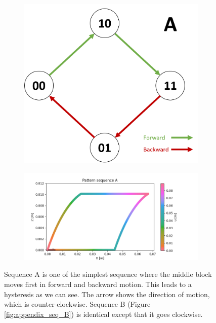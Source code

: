         \begin{figure}[h]
            \centering
            \begin{subfigure}{.2\textwidth}
            \includegraphics[width=\textwidth]{images/S_A.png}
            \end{subfigure}%
            \begin{subfigure}{.6\textwidth}
            \includegraphics[width=\textwidth]{images/A.png}
            \end{subfigure}
            \caption{Sequence A is one of the simplest sequence where the middle block moves first in forward and backward motion. This leads to a hysteresis as we can see. The arrow shows the direction of motion, which is counter-clockwise. Sequence B (Figure \ref{fig:appendix_seq_B}) is identical except that it goes clockwise.}
        \end{figure}
        
